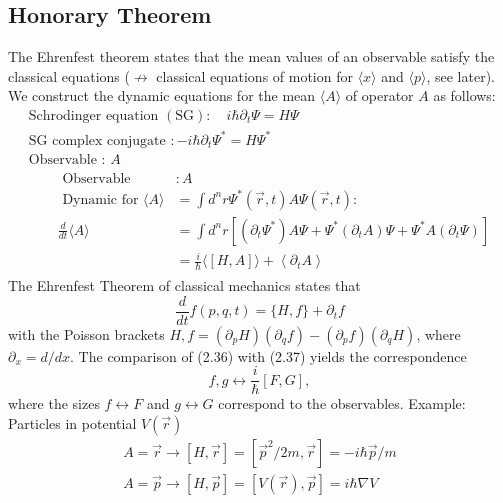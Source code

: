 \subsection{Honorary Theorem}
The Ehrenfest theorem states that the mean values ​​of an observable satisfy the classical equations ($\nrightarrow$ classical equations of motion for $\langle x\rangle$ and $\langle p\rangle$, see later). We construct the dynamic equations for the mean $\langle A\rangle$ of operator $A$ as follows:
\begin{equation}
\begin{array}{l}{\text { Schrodinger equation }(\mathrm{SG}): \quad i \hbar \partial_{t} \Psi=H \Psi} \\ {\text { SG complex conjugate }:-i \hbar \partial_{t} \Psi^{*}=H \Psi^{*}} \\ {\text { Observable : } A} \\ {\qquad \begin{aligned} \text { Observable } &: A \\ \text { Dynamic for }\langle A\rangle &=\int d^{n} r \Psi^{*}(\vec{r}, t) A \Psi(\vec{r}, t): \\ \frac{d}{d t}\langle A\rangle &=\int d^{n} r\left[\left(\partial_{t} \Psi^{*}\right) A \Psi+\Psi^{*}\left(\partial_{t} A\right) \Psi+\Psi^{*} A\left(\partial_{t} \Psi\right)\right] \\ &=\frac{i}{\hbar}\langle[H, A]\rangle+\left\langle\partial_{t} A\right\rangle \end{aligned}}\end{array}
\end{equation}
The Ehrenfest Theorem of classical mechanics states that
\begin{equation}
    \frac{d}{d t} f(p, q, t)=\{H, f\}+\partial_{t} f
\end{equation}
with the Poisson brackets ${H,f}=(\partial_p H)(\partial_q f)-(\partial_p f)(\partial_q H)$, where $\partial_x=d/dx$. The comparison of (2.36) with (2.37) yields the correspondence
\begin{equation}
    {f,g}\leftrightarrow\frac{i}{\hbar}[F,G],
\end{equation}
where the sizes $f\leftrightarrow F$ and $g\leftrightarrow G$ correspond to the observables.
Example: Particles in potential $V(\vec{r})$
\begin{equation}
\begin{array}{l}{A=\vec{r} \longrightarrow[H, \vec{r}]=\left[\vec{p}^{2} / 2 m, \vec{r}\right]=-i \hbar \vec{p} / m} \\ {A=\vec{p} \longrightarrow[H, \vec{p}]=[V(\vec{r}), \vec{p}]=i \hbar \nabla V}\end{array}
\end{equation}
